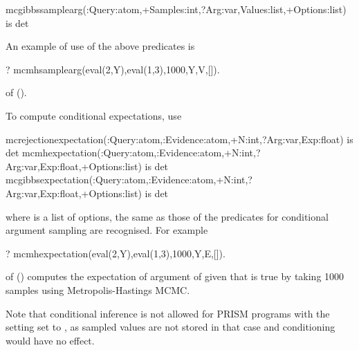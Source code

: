\documentclass[letterpaper,10pt,english]{sphinxmanual}
\begin{document}
\begin{sphinxVerbatim}[commandchars=\\\{\}]
mc\PYGZus{}gibbs\PYGZus{}sample\PYGZus{}arg(:Query:atom,+Samples:int,?Arg:var,\PYGZhy{}Values:list,+Options:list) is det
\end{sphinxVerbatim}

An example of use of the above predicates is

\begin{sphinxVerbatim}[commandchars=\\\{\}]
?\PYGZhy{} mc\PYGZus{}mh\PYGZus{}sample\PYGZus{}arg(eval(2,Y),eval(1,3),1000,Y,V,[]).
\end{sphinxVerbatim}

of ().

To compute conditional expectations, use

\begin{sphinxVerbatim}[commandchars=\\\{\}]
mc\PYGZus{}rejection\PYGZus{}expectation(:Query:atom,:Evidence:atom,+N:int,?Arg:var,\PYGZhy{}Exp:float) is det
mc\PYGZus{}mh\PYGZus{}expectation(:Query:atom,:Evidence:atom,+N:int,?Arg:var,\PYGZhy{}Exp:float,+Options:list) is det
mc\PYGZus{}gibbs\PYGZus{}expectation(:Query:atom,:Evidence:atom,+N:int,?Arg:var,\PYGZhy{}Exp:float,+Options:list) is det
\end{sphinxVerbatim}

where  is a list of options, the same as those of the predicates for conditional argument sampling are recognised. For example

\begin{sphinxVerbatim}[commandchars=\\\{\}]
?\PYGZhy{} mc\PYGZus{}mh\PYGZus{}expectation(eval(2,Y),eval(1,3),1000,Y,E,[]).
\end{sphinxVerbatim}

of () computes the expectation of argument  of  given that  is true by taking 1000 samples using Metropolis-Hastings MCMC.

Note that conditional inference is not allowed for PRISM programs with the setting  set to , as sampled values are not stored in that case and conditioning would have no effect.
\end{document}
